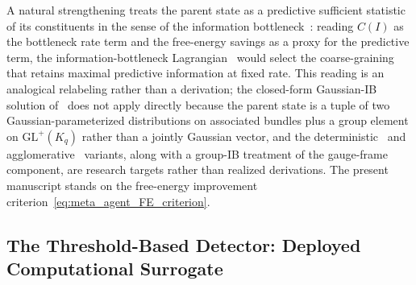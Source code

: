 \documentclass[11pt]{article}
\begin{document}
A natural strengthening treats the parent state as a predictive sufficient statistic of its constituents in the sense of the information bottleneck~\cite{tishby1999information}: reading $C(I)$ as the bottleneck rate term and the free-energy savings as a proxy for the predictive term, the information-bottleneck Lagrangian~\cite{bialek2001predictability} would select the coarse-graining that retains maximal predictive information at fixed rate. This reading is an analogical relabeling rather than a derivation; the closed-form Gaussian-IB solution of~\cite{chechik2005information} does not apply directly because the parent state is a tuple of two Gaussian-parameterized distributions on associated bundles plus a group element on $\mathrm{GL}^+(K_q)$ rather than a jointly Gaussian vector, and the deterministic~\cite{StrouseSchwab2017} and agglomerative~\cite{SlonimTishby2000} variants, along with a group-IB treatment of the gauge-frame component, are research targets rather than realized derivations. The present manuscript stands on the free-energy improvement criterion~\eqref{eq:meta_agent_FE_criterion}.

\subsection{The Threshold-Based Detector: Deployed Computational Surrogate}
\label{sec:meta_agent_threshold}
\end{document}
